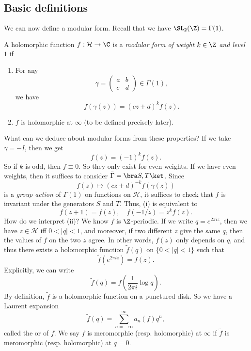 \documentclass[a4paper]{article}
\renewcommand{\H}{\mathcal{H}}
\begin{document}
\subsection{Basic definitions}
We can now define a modular form. Recall that we have $\SL_2(\Z) = \Gamma(1)$.
\begin{defi}
  A holomorphic function $f: \H \to \C$ is a \emph{modular form of weight $k \in \Z$ and level $1$} if
  \begin{enumerate}
    \item For any
      \[
        \gamma =
        \begin{pmatrix}
          a & b\\
          c & d
        \end{pmatrix} \in \Gamma(1),
      \]
      we have
      \[
        f(\gamma(z)) = (cz + d)^k f(z).
      \]
    \item $f$ is holomorphic at $\infty$ (to be defined precisely later).
  \end{enumerate}
\end{defi}
What can we deduce about modular forms from these properties? If we take $\gamma = -I$, then we get
\[
  f(z) = (-1)^k f(z).
\]
So if $k$ is odd, then $f \equiv 0$. So they only exist for even weights. If we have even weights, then it suffices to consider $\bar{\Gamma} = \bra S, T\ket$. Since
\[
  f(z) \mapsto (cz + d)^{-k} f(\gamma(z))
\]
is a \emph{group action} of $\Gamma(1)$ on functions on $\H$, it suffices to check that $f$ is invariant under the generators $S$ and $T$. Thus, (i) is equivalent to
\[
  f(z + 1) = f(z),\quad f(-1/z) = z^k f(z).
\]
How do we interpret (ii)? We know $f$ is $\Z$-periodic. If we write $q = e^{2\pi i z}$, then we have $z \in \H$ iff $0 < |q| < 1$, and moreover, if two different $z$ give the same $q$, then the values of $f$ on the two $z$ agree. In other words, $f(z)$ only depends on $q$, and thus there exists a holomorphic function $\tilde{f}(q)$ on $\{0< |q| < 1\}$ such that
\[
  \tilde{f}(e^{2\pi i z}) = f(z).
\]
Explicitly, we can write
\[
  \tilde{f}(q) = f\left(\frac{1}{2\pi i} \log q\right).
\]
By definition, $\tilde{f}$ is a holomorphic function on a punctured disk. So we have a Laurent expansion
\[
  \tilde{f}(q) = \sum_{n = -\infty}^\infty a_n (f) q^n,
\]
called the  or  of $f$. We say $f$ is meromorphic (resp. holomorphic) at $\infty$ if $\tilde{f}$ is meromorphic (resp. holomorphic) at $q = 0$.
\end{document}
